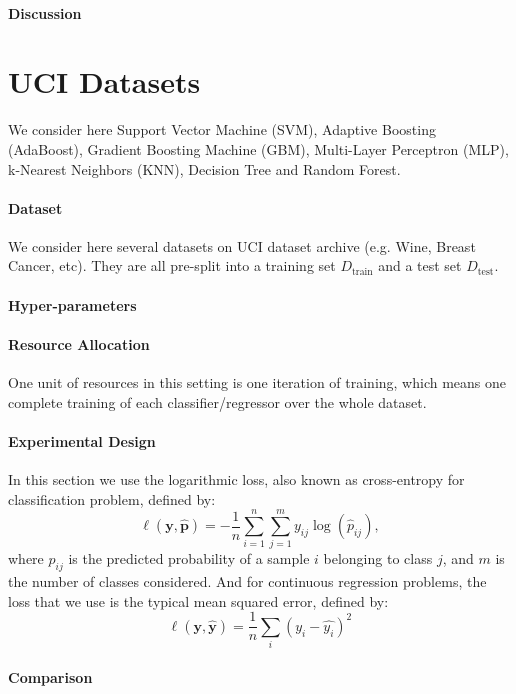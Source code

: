 \documentclass[runningheads,a4paper]{llncs}
\begin{document}
\paragraph{\textbf{Discussion}}


\section{UCI Datasets}

We consider here Support Vector Machine (SVM), Adaptive Boosting (AdaBoost), Gradient Boosting Machine (GBM), Multi-Layer Perceptron (MLP), k-Nearest Neighbors (KNN), Decision Tree and Random Forest.

\paragraph{\textbf{Dataset}} We consider here several datasets on UCI dataset archive (e.g. Wine, Breast Cancer, etc). They are all pre-split into a training set $D_{\operatorname{train}}$ and a test set $D_{\operatorname{test}}$.

\paragraph{\textbf{Hyper-parameters}}

\paragraph{\textbf{Resource Allocation}} One unit of resources in this setting is one iteration of training, which means one complete training of each classifier/regressor over the whole dataset.  

\paragraph{\textbf{Experimental Design}} In this section we use the logarithmic loss, also known as cross-entropy for classification problem, defined by:
\[
\ell(\boldsymbol{y}, \boldsymbol{\hat{p}}) = - \dfrac{1}{n} \sum_{i=1}^n\sum_{j=1}^m y_{ij}\log(\hat{p}_{ij}),
\]
where $\hat{p}_{ij}$ is the predicted probability of a sample $i$ belonging to class $j$, and $m$ is the number of classes considered. And for continuous regression problems, the loss that we use is the typical mean squared error, defined by:
\[
\ell(\boldsymbol{y}, \boldsymbol{\hat{y}}) = \dfrac{1}{n} \sum_i \left(y_i - \hat{y_i}\right)^2
\]

\paragraph{\textbf{Comparison}}
\end{document}

